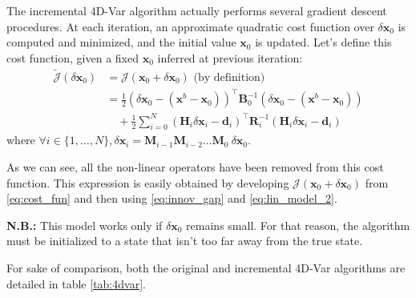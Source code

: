 \documentclass[a4paper,10pt]{article}
\newcommand{\MJ}{\mathcal J}
\newcommand{\BR}{{\mathbf R}}
\newcommand{\BB}{{\mathbf B}}
\newcommand{\BH}{{\mathbf H}}
\newcommand{\BM}{{\mathbf M}}
\newcommand{\bx}{{\boldsymbol x}}
\newcommand{\bd}{{\boldsymbol d}}
\newcommand{\dx}{\delta \bx}
\newcommand{\TJ}{\widetilde{\MJ}}
\newcommand{\ioton}{i \in \{1, \dots, N\}}
\newcommand{\sumin}{\sum_{i=0}^{N}}
\begin{document}
The incremental 4D-Var algorithm actually performs several gradient descent procedures. At each iteration, an approximate quadratic cost function over $\dx_0$ is computed and minimized, and the initial value $\bx_0$ is updated. Let's define this cost function, given a fixed $\bx_0$ inferred at previous iteration:
\begin{equation}
\label{eq:cost_quad}
\begin{split}
	\TJ(\dx_0)
		& = \MJ(\bx_0 + \dx_0) \mbox{ (by definition)} \\
		& = \frac{1}{2} \left(\dx_0 - (\bx^b - \bx_0)\right)^\top \BB_0^{-1} \left(\dx_0 - (\bx^b - \bx_0)\right) \\
		& \quad + \frac{1}{2} \sumin (\BH_i \dx_i - \bd_i)^\top \BR_i^{-1} (\BH_i \dx_i - \bd_i)
\end{split}
\end{equation}
where $\forall \ioton, \dx_i = \BM_{i-1} \BM_{i-2} \dots \BM_0 \: \dx_0$.
\vspace{10pt}

As we can see, all the non-linear operators have been removed from this cost function. This expression is easily obtained by developing $\MJ(\bx_0 + \dx_0)$ from \eqref{eq:cost_fun} and then using \eqref{eq:innov_gap} and \eqref{eq:lin_model_2}.

\textbf{N.B.:} This model works only if $\dx_0$ remains small. For that reason, the algorithm must be initialized to a state that isn't too far away from the true state.
\vspace{10pt}

For sake of comparison, both the original and incremental 4D-Var algorithms are detailed in table \ref{tab:4dvar}.
\vspace{10pt}
\end{document}
